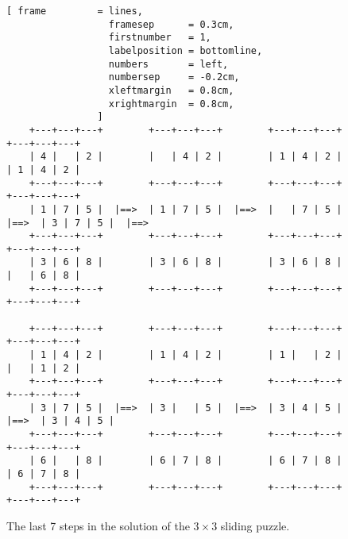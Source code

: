 \begin{figure}[!ht]
\centering
\begin{Verbatim}[ frame         = lines, 
                  framesep      = 0.3cm, 
                  firstnumber   = 1,
                  labelposition = bottomline,
                  numbers       = left,
                  numbersep     = -0.2cm,
                  xleftmargin   = 0.8cm,
                  xrightmargin  = 0.8cm,
                ]
    +---+---+---+        +---+---+---+        +---+---+---+        +---+---+---+        
    | 4 |   | 2 |        |   | 4 | 2 |        | 1 | 4 | 2 |        | 1 | 4 | 2 |
    +---+---+---+        +---+---+---+        +---+---+---+        +---+---+---+
    | 1 | 7 | 5 |  |==>  | 1 | 7 | 5 |  |==>  |   | 7 | 5 |  |==>  | 3 | 7 | 5 |  |==>
    +---+---+---+        +---+---+---+        +---+---+---+        +---+---+---+
    | 3 | 6 | 8 |        | 3 | 6 | 8 |        | 3 | 6 | 8 |        |   | 6 | 8 |
    +---+---+---+        +---+---+---+        +---+---+---+        +---+---+---+

    +---+---+---+        +---+---+---+        +---+---+---+        +---+---+---+        
    | 1 | 4 | 2 |        | 1 | 4 | 2 |        | 1 |   | 2 |        |   | 1 | 2 |
    +---+---+---+        +---+---+---+        +---+---+---+        +---+---+---+
    | 3 | 7 | 5 |  |==>  | 3 |   | 5 |  |==>  | 3 | 4 | 5 |  |==>  | 3 | 4 | 5 |  
    +---+---+---+        +---+---+---+        +---+---+---+        +---+---+---+
    | 6 |   | 8 |        | 6 | 7 | 8 |        | 6 | 7 | 8 |        | 6 | 7 | 8 |
    +---+---+---+        +---+---+---+        +---+---+---+        +---+---+---+
\end{Verbatim}
\vspace*{-0.3cm}
\caption{The last 7 steps in the solution of the $3 \times 3$ sliding puzzle.}
\label{fig:8-puzzle.solution2}
\end{figure}

